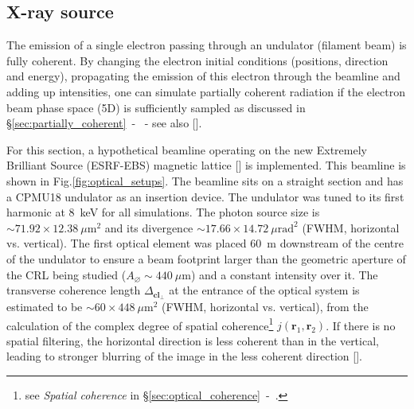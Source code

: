 \begin{refsection}
\subsection{X-ray source}\label{sec:source_sim}
The emission of a single electron passing through an undulator (filament beam) is fully coherent. By changing the electron initial conditions (positions, direction and energy), propagating the emission of this electron through the beamline and adding up intensities, one can simulate partially coherent radiation if the electron beam phase space (5D) is sufficiently sampled as discussed in \S\ref{sec:partially_coherent}~-~\textit{} - see also [\cite{Chubar2011}]. 

For this section, a hypothetical beamline operating on the new Extremely Brilliant Source (ESRF-EBS) magnetic lattice [\cite{orangebook}] is implemented. This beamline is shown in Fig.\ref{fig:optical_setups}. The beamline sits on a straight section and has a CPMU18 undulator as an insertion device. The undulator was tuned to its first harmonic at 8~keV for all simulations. The photon source size is $\sim71.92\times12.38~\mu\text{m}^2$ and its divergence $\sim17.66\times14.72~\mu\text{rad}^2$ (FWHM, horizontal vs. vertical). The first optical element was placed 60~m downstream of the centre of the undulator to ensure a beam footprint larger than the geometric aperture of the CRL being studied ($A_{\diameter}\sim440~\mu\text{m}$) and a constant intensity over it. The transverse coherence length $\Delta_{\textbf{cl}_{\perp}}$ at the entrance of the optical system is estimated to be $\sim60\times448~\mu\text{m}^2$ (FWHM, horizontal vs. vertical), from the calculation of the complex degree of spatial coherence\footnote{see \textit{Spatial coherence} in \S\ref{sec:optical_coherence}~-~\textit{}.} $j(\textbf{r}_1,\textbf{r}_2)$. If there is no spatial filtering, the horizontal direction is less coherent than in the vertical, leading to stronger blurring of the image in the less coherent direction [\cite[\textit{\S7.5}]{Goodman2017}]. 

\end{refsection}
